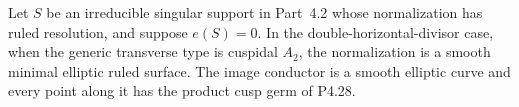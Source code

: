 
\begin{proposition}[P4.29]\hypertarget{tag-02X1}{}\label{night:P4.29}\label{stmt:P4.29}


Let $S$ be an irreducible singular support
in Part~4.2 whose normalization has ruled
resolution, and suppose $e(S)=0$.
In the double-horizontal-divisor case,
when the generic transverse type is
cuspidal $A_2$, the normalization is
a smooth minimal elliptic ruled surface.
The image conductor is a smooth elliptic
curve and every point along it has the
product cusp germ of P4.28.
\end{proposition}

